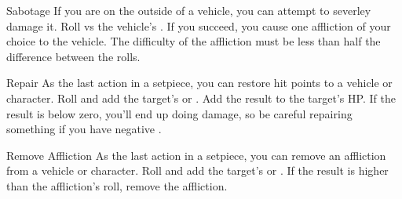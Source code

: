 \begin{describe}{Sabotage}
  If you are on the outside of a vehicle, you can attempt to severley damage it. Roll  vs the vehicle's . If you succeed, you cause one affliction of your choice to the vehicle. The difficulty of the affliction must be less than half the difference between the rolls.
\end{describe}

\hr

\begin{describe}{Repair}
  As the last action in a setpiece, you can restore hit points to a vehicle or character. Roll  and add the target's  or . Add the result to the target's HP. If the result is below zero, you'll end up doing damage, so be careful repairing something if you have negative .
\end{describe}

\begin{describe}{Remove Affliction}
  As the last action in a setpiece, you can remove an affliction from a vehicle or character. Roll  and add the target's  or . If the result is higher than the affliction's  roll, remove the affliction.
\end{describe}
